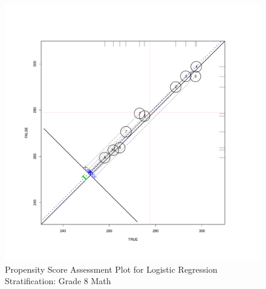 \begin{figure}[h!]
\begin{center}
\includegraphics[height=.4\textheight,width=.4\textheight]{../Figures2009/g8math-circpsa10.pdf}
\caption{Propensity Score Assessment Plot for Logistic Regression Stratification: Grade 8 Math}
\end{center}
\end{figure}



